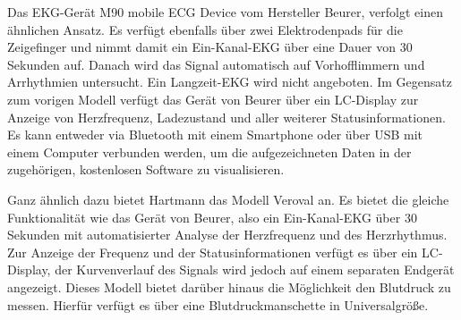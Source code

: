 Das EKG-Gerät M90 mobile ECG Device vom Hersteller Beurer, verfolgt einen ähnlichen Ansatz. Es verfügt ebenfalls über zwei Elektrodenpads für die Zeigefinger und nimmt damit ein Ein-Kanal-EKG über eine Dauer von 30 Sekunden auf. Danach wird das Signal automatisch auf Vorhofflimmern und Arrhythmien untersucht. Ein Langzeit-EKG wird nicht angeboten. Im Gegensatz zum vorigen Modell verfügt das Gerät von Beurer über ein LC-Display zur Anzeige von Herzfrequenz, Ladezustand und aller weiterer Statusinformationen. Es kann entweder via Bluetooth mit einem Smartphone oder über USB mit einem Computer verbunden werden, um die aufgezeichneten Daten in der zugehörigen, kostenlosen Software zu visualisieren. 

Ganz ähnlich dazu bietet Hartmann das Modell Veroval an. Es bietet die gleiche Funktionalität wie das Gerät von Beurer, also ein Ein-Kanal-EKG über 30 Sekunden mit automatisierter Analyse der Herzfrequenz und des Herzrhythmus. Zur Anzeige der Frequenz und der Statusinformationen verfügt es über ein LC-Display, der Kurvenverlauf des Signals wird jedoch auf einem separaten Endgerät angezeigt. Dieses Modell bietet darüber hinaus die Möglichkeit den Blutdruck zu messen. Hierfür verfügt es über eine Blutdruckmanschette in Universalgröße.








